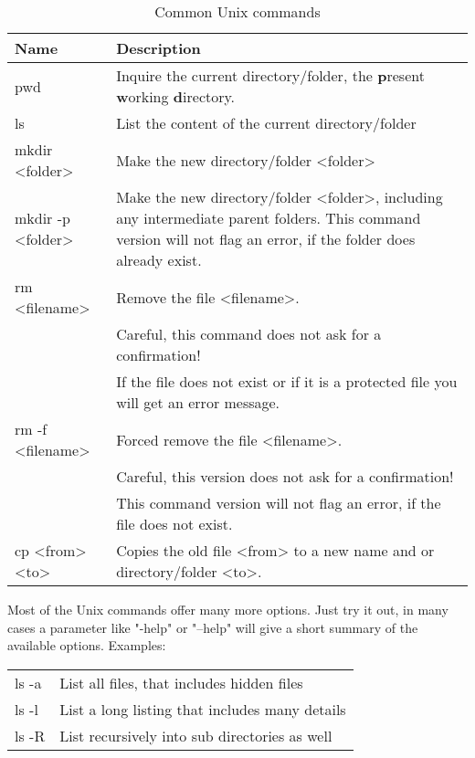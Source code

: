 \documentclass[11pt]{report}
\begin{document}
{\begin{table}[!tbh]
\centering
\begin{tabularx}{\textwidth}{|p{50mm}|X|}
  \hline
  {\bf Name} &  {\bf Description} \\
  \hline \hline
   pwd & Inquire the current directory/folder, the
          {\bf p}resent {\bf w}orking {\bf d}irectory.\\
  \hline
   ls    & List the content of the current directory/folder\\
  \hline
   mkdir <folder> & Make the new directory/folder <folder> \\
  \hline
   mkdir -p <folder> & Make the new directory/folder <folder>,
         including any intermediate parent folders. 
         This command version will not flag an error,
         if the folder does already exist. \\
  \hline
   rm <filename> & Remove the file <filename>. \\
       & Careful, this command does not ask for 
         a confirmation! \\
       & If the file does not exist
         or if it is a protected file you will get an
         error message.\\
  \hline
   rm -f <filename> & Forced remove the file <filename>. \\
       & Careful, this version does not ask for a confirmation!\\
       & This command version will not flag an error,
         if the file does not exist. \\
  \hline
   cp <from> <to> & Copies the old file <from> to a new name and
         or directory/folder <to>.\\
  \hline
\end{tabularx}
\caption{\label{over-unix}Common Unix commands}
\end{table}

Most of the Unix commands offer many more options. Just try it 
out, in many cases a parameter like "-help" 
or "--help" will give a short summary of the available options.
Examples:

\begin{tabularx}{\textwidth}{p{25mm}X}
ls -a & List all files, that includes hidden files\\
ls -l & List a long listing that includes many details\\
ls -R & List recursively into sub directories as well\\
\end{tabularx}

}
\end{document}
